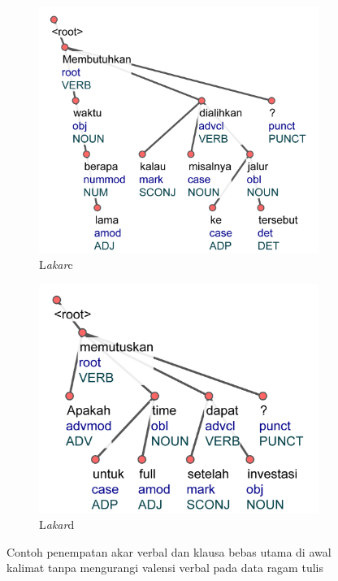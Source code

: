 \begin{figure}
\centering

\begin{subfigure}{.49\linewidth}
  \centering
  \includegraphics[width=1\linewidth] {pics/ls4820.jpg} 
	\caption{L\textit{akar}c}
	\label{fig:ls4820} 
\end{subfigure}
%
\begin{subfigure}{.41\linewidth}
  \centering
  \includegraphics[width=1\linewidth]{pics/ls1435.jpg} 
	\caption{L\textit{akar}d}
	\label{fig:ls1435} 
\end{subfigure}
\caption{Contoh penempatan akar verbal dan klausa bebas utama di awal kalimat tanpa mengurangi valensi verbal pada data ragam tulis}
\label{fig:rootvalensi}
\end{figure}

